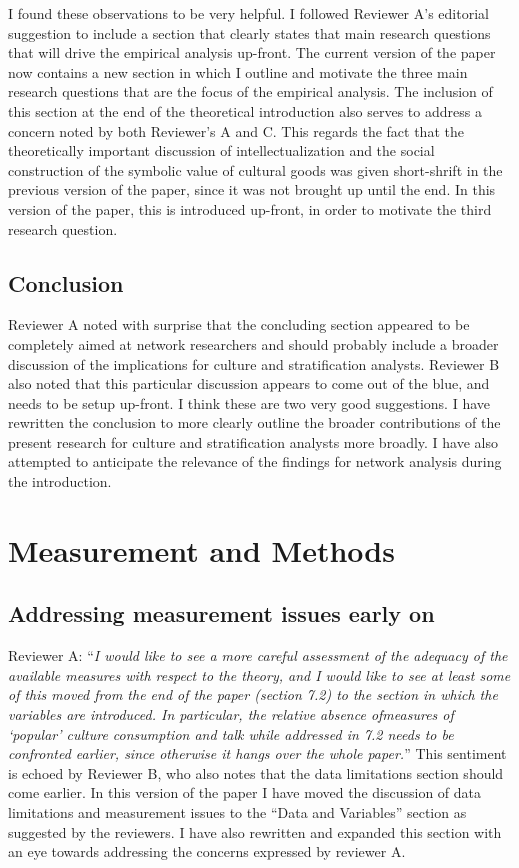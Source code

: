 \documentclass[11pt]{article}
\begin{document}
I found these observations to be very helpful.   I followed Reviewer A's editorial suggestion to include a section that clearly states that main research questions that will drive the empirical analysis up-front. The current version of the paper now contains a new section in which I outline and motivate the three main research questions that are the focus of the empirical analysis.  The inclusion of this section at the end of the theoretical introduction also serves to address a  concern noted by both Reviewer's A and C.  This regards the fact that the theoretically important discussion of intellectualization and the social construction of the symbolic value of cultural goods was given short-shrift in the previous version of the paper, since it was not brought up until the end.  In this version of the paper, this is introduced up-front, in order to motivate the third research question.

\subsection*{Conclusion}
Reviewer A noted with surprise that the concluding section appeared to be completely aimed at network researchers and should probably include a broader discussion of the implications for culture and stratification analysts.  Reviewer B also noted that this particular discussion appears to come out of the blue, and needs to be setup up-front.   I think these are two very good suggestions.  I have rewritten the conclusion to more clearly outline the broader contributions of the present research for culture and stratification analysts more broadly.  I have also attempted to anticipate the relevance of the findings for network analysis during the introduction. 

\section*{Measurement and Methods}
\subsection*{Addressing measurement issues early on}
Reviewer A: ``\emph{I would like to see a more careful assessment of the adequacy of the available measures with respect to the theory, and I would like to see at least some of this moved from the end of the paper (section 7.2) to the section in which the variables are introduced. In particular, the relative absence ofmeasures of `popular' culture consumption and talk while addressed in 7.2 needs to be confronted earlier, since otherwise it hangs over the whole paper.}''  This sentiment is echoed by Reviewer B, who also notes that the data limitations section should come earlier.  In this version of the paper I have moved the discussion of data limitations and measurement issues to the ``Data and Variables'' section as suggested by the reviewers.  I have also rewritten and expanded this section with an eye towards addressing the concerns expressed by reviewer A. 
\end{document}
